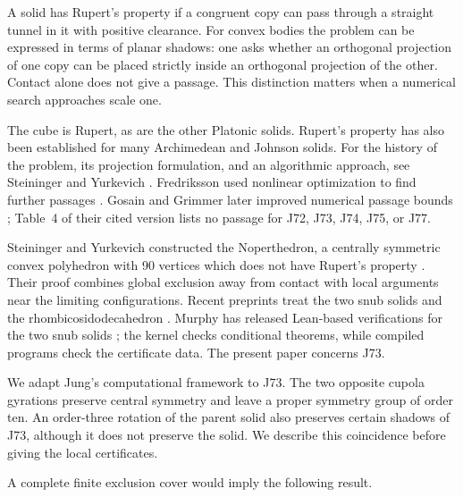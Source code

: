 \documentclass[11pt]{amsart}
\theoremstyle{definition}
\theoremstyle{remark}
\begin{document}
A solid has Rupert's property if a congruent copy can pass through a
straight tunnel in it with positive clearance. For convex bodies the
problem can be expressed in terms of planar shadows: one asks whether an
orthogonal projection of one copy can be placed strictly inside an
orthogonal projection of the other. Contact alone does not give a passage.
This distinction matters when a numerical search approaches scale one.

The cube is Rupert, as are the other Platonic solids. Rupert's property
has also been established for many Archimedean and Johnson solids.
For the history of the problem, its projection formulation, and an
algorithmic approach, see Steininger and Yurkevich \cite{algorithmic,sy}.
Fredriksson used nonlinear optimization to find further passages
\cite{fredriksson}. Gosain and Grimmer later improved numerical passage
bounds \cite{gg}; Table~4 of their cited version lists no passage for
J72, J73, J74, J75, or J77.

Steininger and Yurkevich constructed the Noperthedron, a centrally
symmetric convex polyhedron with 90 vertices which does not have Rupert's
property \cite{sy}. Their proof combines global exclusion away from
contact with local arguments near the limiting configurations. Recent
preprints treat the two snub solids \cite{lw} and the
rhombicosidodecahedron \cite{jung,hervay}. Murphy has released Lean-based
verifications for the two snub solids \cite{murphy}; the kernel checks
conditional theorems, while compiled programs check the certificate data.
The present paper concerns J73.

We adapt Jung's computational framework to J73. The two opposite cupola
gyrations preserve central symmetry and leave a proper symmetry group
of order ten. An order-three rotation of the parent solid also preserves
certain shadows of J73, although it does not preserve the solid.
We describe this coincidence before giving the local certificates.

A complete finite exclusion cover would imply the following result.
\end{document}

